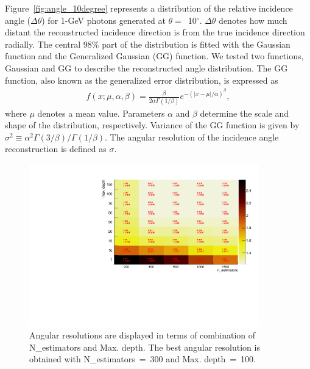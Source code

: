 \documentclass[preprint,12pt,times,a4paper]{elsarticle}
\begin{document}
Figure~\ref{fig:angle_10degree} represents a distribution of the relative incidence angle ($\Delta\theta$) for 1-GeV photons generated at $\theta=$~10$^{\circ}$. $\Delta\theta$ denotes how much distant the reconstructed incidence direction is from the true incidence direction radially. The central 98\% part of the distribution is fitted with the Gaussian function and the Generalized Gaussian (GG) function. We tested two functions, Gaussian and GG to describe the reconstructed angle distribution. The GG function, also known as the generalized error distribution, is expressed as
\begin{eqnarray} 
f(x; \mu, \alpha, \beta) = \frac{\beta}{2 \alpha \Gamma(1/\beta)}e^{-(|x-\mu|/\alpha)^\beta},
\label{eqn:gg}
\end{eqnarray}
where $\mu$ denotes a mean value. Parameters $\alpha$ and $\beta$ determine the scale and shape of the distribution, respectively. Variance of the GG function is given by $\sigma^2 \equiv \alpha^2 \Gamma(3/\beta) / \Gamma(1/\beta)$. The angular resolution of the incidence angle reconstruction is defined as $\sigma$.

\begin{figure}[!hbt]
\includegraphics[width=0.89\textwidth]{figures/Fig4_Opt.pdf}
\caption{Angular resolutions are displayed in terms of combination of N\_estimators and Max. depth. The best angular resolution is obtained with N\_estimators~=~300 and Max. depth~=~100. }
\label{fig:par_scan}
\end{figure}
\end{document}
